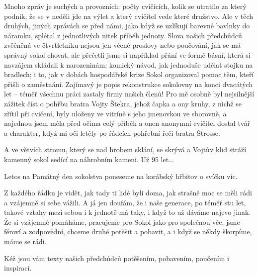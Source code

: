 \documentclass[11pt]{article}
\begin{document}
Mnoho zpráv je suchých a provozních: počty cvičících, kolik se utratilo
za který podnik, že se v neděli jde na výlet a který cvičitel vede které
družstvo. Ale v těch druhých, jiných zprávách se před námi, jako když se
uzlíkují barevné bavlnky do náramku, splétal z jednotlivých nitek příběh
jednoty. Slova našich předchůdců zvěčněná ve čtvrtletníku nejsou jen
věcné proslovy nebo poučování, jak se má správný sokol chovat, ale
přečetli jsme si například přání ve formě básní, která si navzájem
skládali k narozeninám; komický návod, jak jednoduše udělat stojku na
bradlech; i to, jak v dobách hospodářské krize Sokol organizoval pomoc
těm, kteří přišli o zaměstnání. Zajímavý je popis rekonstrukce sokolovny
na konci dvacátých let -- téměř všechnu práci zastaly firmy našich
členů! Pro mě osobně byl nejsilnější zážitek číst o pohřbu bratra Vojty
Štekra, jehož čapka a ony kruhy, z nichž se zřítil při cvičení, byly
uloženy ve vitríně s jeho jmenovkou ve sborovně, a najednou jsem měla
před očima celý příběh a onen anonymní cvičitel dostal tvář a charakter,
když mi oči letěly po řádcích pohřební řeči bratra Štrosse.

 A ve větvích stromu, který se nad hrobem sklání, se
skrývá a Vojtův klid stráží kamenný sokol sedící na náhrobním kameni. Už
95 let\ldots{}

Letos na Památný den sokolstva poneseme na korábský hřbitov o svíčku
víc.

Z každého řádku je vidět, jak tady ti lidé byli doma, jak strašně moc se
měli rádi a vzájemně si sebe vážili. A já jen doufám, že i naše
generace, po téměř stu let, takové vztahy mezi sebou i k jednotě má
taky, i když to už dáváme najevo jinak. Že si vzájemně pomáháme,
pracujeme pro Sokol jako pro společnou věc, jsme féroví a zodpovědní,
chceme druhé potěšit a pobavit, a i když se někdy škorpíme, máme se
rádi.

Kéž jsou vám texty našich předchůdců potěšením, pobavením, poučením i
inspirací.

\signature{Vaše vzdělavatelka Anka}


\clearpage

\restoregeometry
\pagestyle{stare-zpravy}

\setlength{\parindent}{0pt}
\newlength{\imagewidth}
\setlength{\imagewidth}{\textwidth}

\vspace{\baselineskip}
\end{document}
